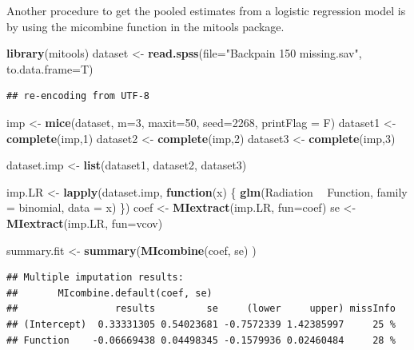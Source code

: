 \documentclass[]{book}
\newenvironment{Shaded}{\begin{snugshade}}{\end{snugshade}}
\newcommand{\KeywordTok}[1]{\textcolor[rgb]{0.13,0.29,0.53}{\textbf{#1}}}
\newcommand{\DataTypeTok}[1]{\textcolor[rgb]{0.13,0.29,0.53}{#1}}
\newcommand{\DecValTok}[1]{\textcolor[rgb]{0.00,0.00,0.81}{#1}}
\newcommand{\StringTok}[1]{\textcolor[rgb]{0.31,0.60,0.02}{#1}}
\newcommand{\ControlFlowTok}[1]{\textcolor[rgb]{0.13,0.29,0.53}{\textbf{#1}}}
\newcommand{\OperatorTok}[1]{\textcolor[rgb]{0.81,0.36,0.00}{\textbf{#1}}}
\newcommand{\NormalTok}[1]{#1}
\theoremstyle{definition}
\theoremstyle{definition}
\theoremstyle{definition}
\theoremstyle{remark}
\begin{document}
Another procedure to get the pooled estimates from a logistic regression
model is by using the micombine function in the mitools package.

\begin{Shaded}
\begin{Highlighting}[]
\KeywordTok{library}\NormalTok{(mitools)}
\NormalTok{dataset <-}\StringTok{ }\KeywordTok{read.spss}\NormalTok{(}\DataTypeTok{file=}\StringTok{"Backpain 150 missing.sav"}\NormalTok{, }\DataTypeTok{to.data.frame=}\NormalTok{T)}
\end{Highlighting}
\end{Shaded}

\begin{verbatim}
## re-encoding from UTF-8
\end{verbatim}

\begin{Shaded}
\begin{Highlighting}[]
\NormalTok{imp <-}\StringTok{ }\KeywordTok{mice}\NormalTok{(dataset, }\DataTypeTok{m=}\DecValTok{3}\NormalTok{, }\DataTypeTok{maxit=}\DecValTok{50}\NormalTok{, }\DataTypeTok{seed=}\DecValTok{2268}\NormalTok{, }\DataTypeTok{printFlag =}\NormalTok{ F)}
\NormalTok{dataset1 <-}\StringTok{ }\KeywordTok{complete}\NormalTok{(imp,}\DecValTok{1}\NormalTok{)}
\NormalTok{dataset2 <-}\StringTok{ }\KeywordTok{complete}\NormalTok{(imp,}\DecValTok{2}\NormalTok{)}
\NormalTok{dataset3 <-}\StringTok{ }\KeywordTok{complete}\NormalTok{(imp,}\DecValTok{3}\NormalTok{)}
 
\NormalTok{dataset.imp <-}\StringTok{ }\KeywordTok{list}\NormalTok{(dataset1, dataset2, dataset3)}
 
\NormalTok{imp.LR <-}\StringTok{ }\KeywordTok{lapply}\NormalTok{(dataset.imp, }\ControlFlowTok{function}\NormalTok{(x) \{}
   \KeywordTok{glm}\NormalTok{(Radiation }\OperatorTok{~}\StringTok{ }\NormalTok{Function, }\DataTypeTok{family =}\NormalTok{ binomial, }\DataTypeTok{data =}\NormalTok{ x)}
\NormalTok{  \})}
\NormalTok{coef <-}\StringTok{ }\KeywordTok{MIextract}\NormalTok{(imp.LR, }\DataTypeTok{fun=}\NormalTok{coef) }
\NormalTok{se <-}\StringTok{ }\KeywordTok{MIextract}\NormalTok{(imp.LR, }\DataTypeTok{fun=}\NormalTok{vcov) }
 
\NormalTok{summary.fit <-}\StringTok{ }\KeywordTok{summary}\NormalTok{(}\KeywordTok{MIcombine}\NormalTok{(coef, se) )}
\end{Highlighting}
\end{Shaded}

\begin{verbatim}
## Multiple imputation results:
##       MIcombine.default(coef, se)
##                 results         se     (lower     upper) missInfo
## (Intercept)  0.33331305 0.54023681 -0.7572339 1.42385997     25 %
## Function    -0.06669438 0.04498345 -0.1579936 0.02460484     28 %
\end{verbatim}
\end{document}
